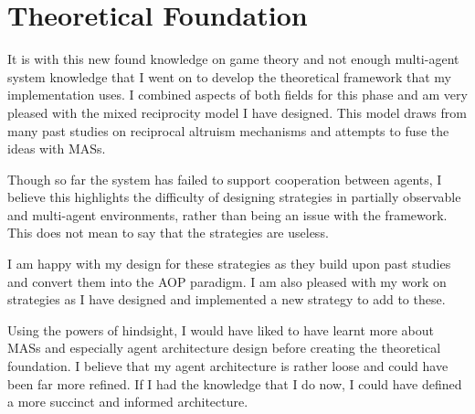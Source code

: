\documentclass[]{final_report}
\begin{document}
\section{Theoretical Foundation}
It is with this new found knowledge on game theory and not enough multi-agent system knowledge that I went on to develop the theoretical framework that my implementation uses. I combined aspects of both fields for this phase and am very pleased with the mixed reciprocity model I have designed. This model draws from many past studies on reciprocal altruism mechanisms and attempts to fuse the ideas with MASs.\par 
Though so far the system has failed to support cooperation between agents, I believe this highlights the difficulty of designing strategies in partially observable and multi-agent environments, rather than being an issue with the framework. This does not mean to say that the strategies are useless.\par 
I am happy with my design for these strategies as they build upon past studies and convert them into the AOP paradigm. I am also pleased with my work on strategies as I have designed and implemented a new strategy to add to these.\par 
Using the powers of hindsight, I would have liked to have learnt more about MASs and especially agent architecture design before creating the theoretical foundation. I believe that my agent architecture is rather loose and could have been far more refined. If I had the knowledge that I do now, I could have defined a more succinct and informed architecture.
\end{document}
